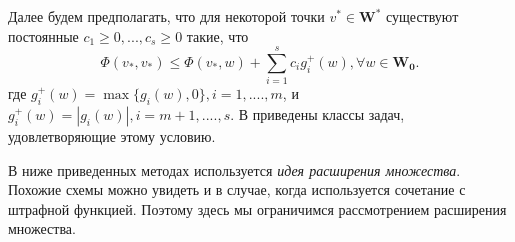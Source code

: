 Далее будем предполагать, что для некоторой точки $v^* \in\mathbf{W^{*}}$ существуют постоянные $c_1\geqslant 0,...,c_s\geqslant 0$ такие, что
\begin{equation}
\label{key-condition}
\Phi(v_*,v_*)\leqslant \Phi(v_*,w)+\sum_{i=1}^{s}c_ig_i^+(w),\forall w\in\mathbf{W_0}.
\end{equation}
где $g_i^+(w)=\max\{g_i(w),0\},i=1,....,m$, и $g_i^+(w)=|g_i(w)|,i=m+1,....,s$. В \cite{centralbib} приведены классы задач, удовлетворяющие этому условию.

В ниже приведенных методах используется \textit{идея расширения множества}. Похожие схемы можно увидеть и в случае, когда используется сочетание с штрафной функцией\cite{centralbib}\cite{12}\cite{13}. Поэтому здесь мы ограничимся рассмотрением расширения множества.

